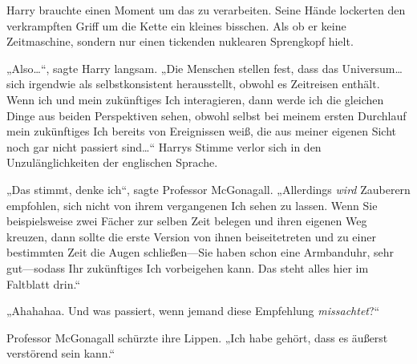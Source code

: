 Harry brauchte einen Moment um das zu verarbeiten. Seine Hände lockerten den verkrampften Griff um die Kette ein kleines bisschen. Als ob er keine Zeitmaschine, sondern nur einen tickenden nuklearen Sprengkopf hielt.

„Also…“, sagte Harry langsam. „Die Menschen stellen fest, dass das Universum…sich irgendwie als selbstkonsistent herausstellt, obwohl es Zeitreisen enthält. Wenn ich und mein zukünftiges Ich interagieren, dann werde ich die gleichen Dinge aus beiden Perspektiven sehen, obwohl selbst bei meinem ersten Durchlauf mein zukünftiges Ich bereits von Ereignissen weiß, die aus meiner eigenen Sicht noch gar nicht passiert sind…“ Harrys Stimme verlor sich in den Unzulänglichkeiten der englischen Sprache.

„Das stimmt, denke ich“, sagte Professor McGonagall. „Allerdings \emph{wird} Zauberern empfohlen, sich nicht von ihrem vergangenen Ich sehen zu lassen. Wenn Sie beispielsweise zwei Fächer zur selben Zeit belegen und ihren eigenen Weg kreuzen, dann sollte die erste Version von ihnen beiseitetreten und zu einer bestimmten Zeit die Augen schließen—Sie haben schon eine Armbanduhr, sehr gut—sodass Ihr zukünftiges Ich vorbeigehen kann. Das steht alles hier im Faltblatt drin.“

„Ahahahaa. Und was passiert, wenn jemand diese Empfehlung \emph{missachtet}?“

Professor McGonagall schürzte ihre Lippen. „Ich habe gehört, dass es äußerst verstörend sein kann.“

